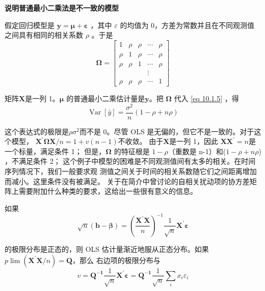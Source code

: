     {\bf 说明普通最小二乘法是不一致的模型}

    假定回归模型是 $\boldsymbol{y = \mu + \varepsilon} $ ，其中 $ \varepsilon $ 的均值为 0，方差为常数并且在不同观测值之间具有相同的相关系数 $ \rho $ 。于是
    $$ \boldsymbol{\Omega} = \left[\begin{array}{ccccc}
        1 & \rho & \rho & \cdots & \rho \\
        \rho & 1 & \rho & \cdots & \rho \\
        \rho & \rho & 1 & \cdots & \rho \\
        & & & \vdots & \\
        \rho & \rho & \rho & \cdots & 1
        \end{array}\right] $$
    
    矩阵$ \boldsymbol{X} $是一列 1。$ \boldsymbol{\mu} $ 的普通最小二乘估计量是$ \boldsymbol{y} $。把 $ \boldsymbol{\Omega} $ 代入 \eqref{eq 10.1.5} ，得
    \begin{equation}
        \operatorname{Var}[\bar{y}]=\frac{\sigma^{2}}{n}(1-\rho+n \rho)
    \end{equation}

    这个表达式的极限是$ \rho \sigma^{2} $而不是 0。尽管 OLS 是无偏的，但它不是一致的。对于这个模型， $ \boldsymbol{X^{\prime} \Omega X} / n = 1+v(n-1)$不收敛。
    由于$ \boldsymbol{X} $是一列 1，因此 $ \boldsymbol{XX^{\prime}} = n $是一个标量，满足条件 1；
    但是，$ \boldsymbol{\Omega} $ 的特征根是 $ 1− \rho $（重数是 n-1）和($1− \rho + n\rho$) ，不满足条件 2；
     这个例子中模型的困难是不同观测值间有太多的相关。在时间序列情况下，我们一般要求观
    测值之间关于时间的相关系数随它们之间距离增加而减小。这里条件没有被满足。
    关于在简介中曾讨论的自相关扰动项的协方差矩阵上需要附加什么种类的要求，这给出一些很有意义的信息。

    如果
    \begin{equation}
        \sqrt{n}(\boldsymbol{b-\beta})=
        \left(\frac{\boldsymbol{X^{\prime} X}}{n}\right)^{-1} \frac{1}{\sqrt{n}} \boldsymbol{X^{\prime} \varepsilon}
    \end{equation}

    的极限分布是正态的，则 OLS 估计量渐近地服从正态分布。如果 $ p \lim ( \boldsymbol{X^{\prime} X} / n) = \boldsymbol{Q} $，那么 右边项的极限分布与
    \begin{equation}
        v = \boldsymbol{Q^{-1}} \frac{1}{\sqrt{n}} \boldsymbol{X^{\prime} \varepsilon=Q^{-1}} \frac{1}{\sqrt{n}} \sum_{i} x_{i} \varepsilon_{i}
        \label{eq 10.1.8}
    \end{equation}

